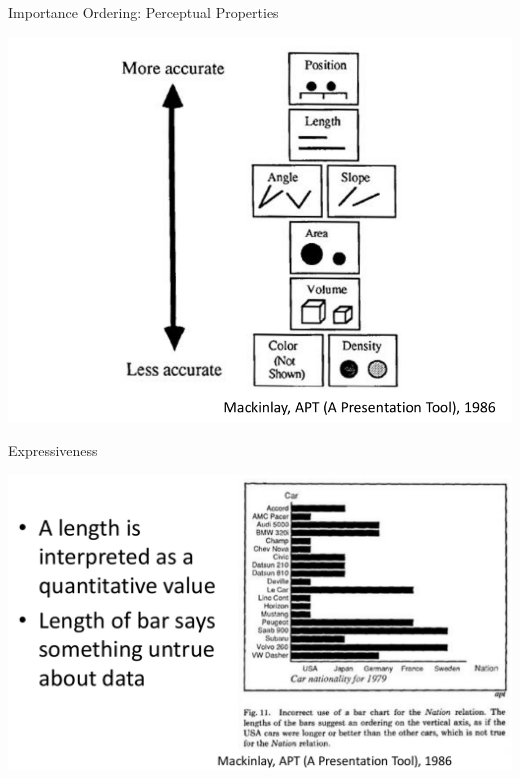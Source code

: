 \documentclass{beamer}
\begin{document}
\begin{frame}{Importance Ordering: Perceptual Properties} 
    \begin{center}
        \includegraphics[scale=0.3]{mckinlaysOrdering.png}
    \end{center}
\end{frame}  
\begin{frame}{Expressiveness}
    \begin{center}
        \includegraphics[scale=0.3]{mackinlayExpressiveness.png}
    \end{center}
\end{frame}  
\end{document}
